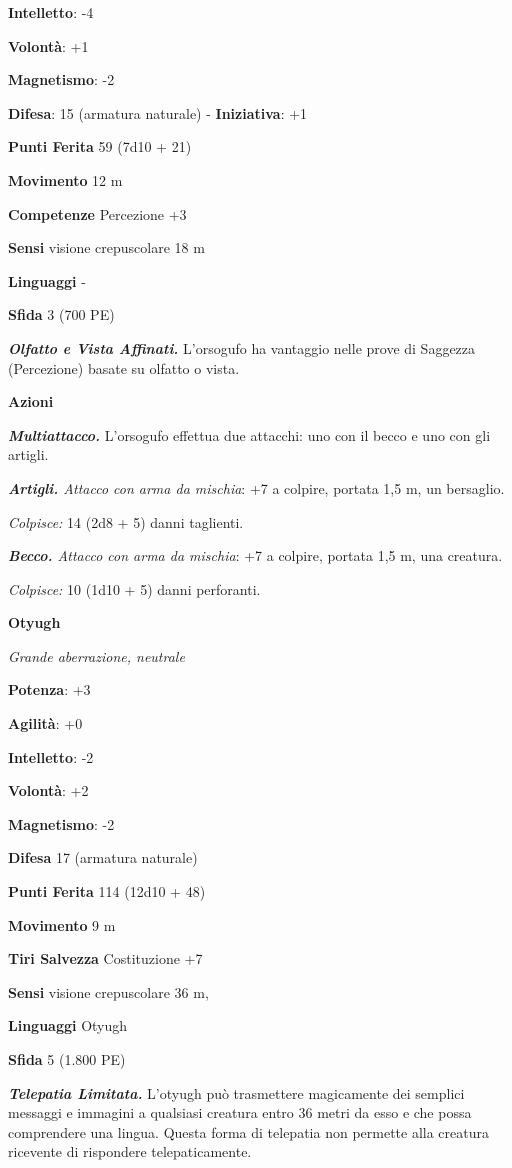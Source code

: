 \begin{multicols}{2}
\textbf{Intelletto}: -4

\textbf{Volontà}: +1

\textbf{Magnetismo}: -2

\textbf{Difesa}: 15 (armatura naturale) - \textbf{Iniziativa}: +1

\textbf{Punti Ferita} 59 (7d10 + 21)

\textbf{Movimento} 12 m

\textbf{Competenze} Percezione +3

\textbf{Sensi} visione crepuscolare 18 m

\textbf{Linguaggi} -

\textbf{Sfida} 3 (700 PE)

\emph{\textbf{Olfatto e Vista Affinati.}} L'orsogufo ha vantaggio nelle
prove di Saggezza (Percezione) basate su olfatto o vista.

\textbf{Azioni}

\emph{\textbf{Multiattacco.}} L'orsogufo effettua due attacchi: uno con
il becco e uno con gli artigli.

\emph{\textbf{Artigli.} Attacco con arma da mischia}: +7 a colpire,
portata 1,5 m, un bersaglio.

\emph{Colpisce:} 14 (2d8 + 5) danni taglienti.

\emph{\textbf{Becco.} Attacco con arma da mischia}: +7 a colpire,
portata 1,5 m, una creatura.

\emph{Colpisce:} 10 (1d10 + 5) danni perforanti.


\textbf{Otyugh}

\emph{Grande aberrazione, neutrale}

\textbf{Potenza}: +3

\textbf{Agilità}: +0

\textbf{Intelletto}: -2

\textbf{Volontà}: +2

\textbf{Magnetismo}: -2

\textbf{Difesa} 17 (armatura naturale)

\textbf{Punti Ferita} 114 (12d10 + 48)

\textbf{Movimento} 9 m

\textbf{Tiri Salvezza} Costituzione +7

\textbf{Sensi} visione crepuscolare 36 m, 

\textbf{Linguaggi} Otyugh

\textbf{Sfida} 5 (1.800 PE)

\emph{\textbf{Telepatia Limitata.}} L'otyugh può trasmettere magicamente
dei semplici messaggi e immagini a qualsiasi creatura entro 36 metri da
esso e che possa comprendere una lingua. Questa forma di telepatia non
permette alla creatura ricevente di rispondere telepaticamente.


\end{multicols}
